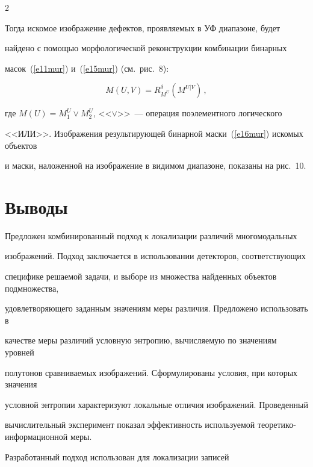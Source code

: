 \begin{multicols}{2}
  


  Тогда искомое изображение дефектов, проявляемых в УФ диапазоне, будет 


найдено с помощью морфологической реконструкции комбинации бинарных 


масок~(\ref{e11mur}) и~(\ref{e15mur}) (см.\ рис.~8):


  \begin{equation}


  M(U,V) =R^\delta_{M^U}\left(M^{U\vert V}\right)\,,


  \label{e16mur}


  \end{equation}


где $M(U)=M_1^U\vee M_2^U$, <<$\vee$>>~--- операция поэлементного логического 


<<ИЛИ>>. Изображения результирующей бинарной маски~(\ref{e16mur}) искомых объектов 


и маски, наложенной на изображение в видимом диапазоне, показаны на рис.~10.








\section{Выводы}





  Предложен комбинированный подход к локализации различий многомодальных 


изображений. Подход заключается в использовании детекторов, соответствующих 


специфике решаемой задачи, и выборе из множества найденных объектов подмножества, 


удовлетворяющего заданным значениям меры различия. Предложено использовать в 


качестве меры различий условную энтропию, вычисляемую по значениям уровней 


полутонов срав\-ни\-ва\-емых изображений. Сформулированы условия, при которых значения 


условной энтропии характеризуют локальные отличия изображений. Проведенный 


вычислительный эксперимент показал эффективность используемой теоретико-информационной меры. 





Разработанный подход использован для локализации записей 



\end{multicols}
